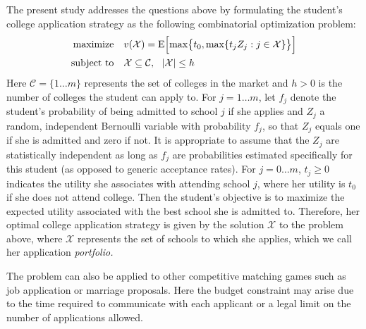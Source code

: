 The present study addresses the questions above by formulating the student's college application strategy as the following combinatorial optimization problem:
\begin{align} \label{headlineproblem}
\begin{split}
\text{maximize}\quad & v(\mathcal{X}) =  \operatorname{E}\Bigl[\max\bigr\{t_0,
\max\{t_j Z_j : j \in \mathcal{X}\}\bigr\}\Bigr] \\
\text{subject to}\quad & \mathcal{X} \subseteq \mathcal{C}, ~~|\mathcal{X}| \leq h
\end{split}
\end{align}
Here $\mathcal{C} = \{ 1 \dots m\}$ represents the set of colleges in the market and $h > 0$ is the number of colleges the student can apply to. For $j = 1 \dots m$, let $f_j$ denote the student's probability of being admitted to school $j$ if she applies and $Z_j$ a random, independent Bernoulli variable with probability $f_j$, so that $Z_j$ equals one if she is admitted and zero if not. It is appropriate to assume that the $Z_j$ are statistically independent as long as $f_j$ are probabilities estimated specifically for this student (as opposed to generic acceptance rates). For $j = 0\dots m$, $t_j\geq 0$ indicates the utility she associates with attending school $j$, where her utility is $t_0$ if she does not attend college. Then the student's objective is to maximize the expected utility associated with the best school she is admitted to. Therefore, her optimal college application strategy is given by the solution $\mathcal{X}$ to the problem above, where $\mathcal{X}$ represents the set of schools to which she applies, which we call her application \emph{portfolio.}

The problem can also be applied to other competitive matching games such as job application or marriage proposals. Here the budget constraint may arise due to the time required to communicate with each applicant or a legal limit on the number of applications allowed.

